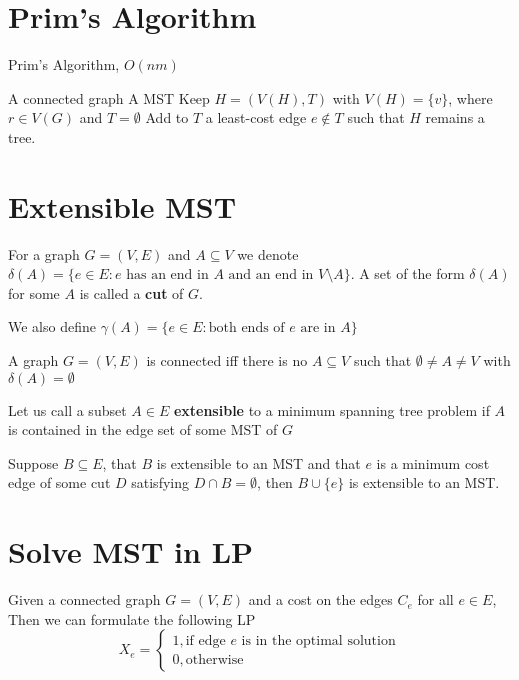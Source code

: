 			\section{Prim's Algorithm}
				\begin{algorithm}
					\caption{Prim's Algorithm, $O(nm)$}
					\begin{algorithmic}
						\Require A connected graph
						\Ensure A MST
						\State Keep $H = (V(H), T)$ with $V(H) = \{v\}$, where $r\in V(G)$ and $T=\emptyset$
							\State Add to $T$ a least-cost edge $e \notin T$ such that $H$ remains a tree.
						\EndWhile
					\end{algorithmic}
				\end{algorithm}

			\section{Extensible MST}
				\begin{definition}[cut]
					For a graph $G=(V, E)$ and $A \subseteq V$ we denote $\delta(A) = \{e \in E :\text{$e$ has an end in $A$ and an end in $V\setminus A$}\}$. A set of the form $\delta(A)$ for some $A$ is called a \textbf{cut} of $G$.
				\end{definition}

				\begin{definition}
					We also define $\gamma(A) = \{e\in E: \text{both ends of $e$ are in $A$}\}$
				\end{definition}

				\begin{theorem}
					A graph $G=(V, E)$ is connected iff there is no $A\subseteq V$ such that $\emptyset \ne A \ne V$ with $\delta(A) = \emptyset$
				\end{theorem}

				\begin{definition}
					Let us call a subset $A \in E$ \textbf{extensible} to a minimum spanning tree problem if $A$ is contained in the edge set of some MST of $G$
				\end{definition}

				\begin{theorem}
					Suppose $B \subseteq E$, that $B$ is extensible to an MST and that $e$ is a minimum cost edge of some cut $D$ satisfying $D\cap B = \emptyset$, then $B\cup \{e\}$ is extensible to an MST.
				\end{theorem}

			\section{Solve MST in LP}
				Given a connected graph $G=(V, E)$ and a cost on the edges $C_e$ for all $e\in E$, Then we can formulate the following LP
				\begin{equation}
					X_e = \begin{cases}
						1, \text{if edge $e$ is in the optimal solution} \\
						0, \text{otherwise}
					\end{cases}
				\end{equation}

